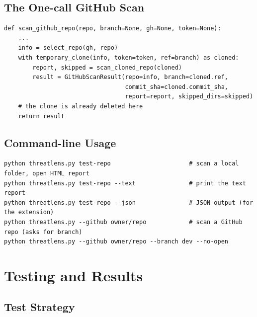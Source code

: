 \documentclass[12pt,a4paper]{article}
\newcommand{\code}[1]{\texttt{\detokenize{#1}}}
\begin{document}
\subsection{The One-call GitHub Scan}

\begin{lstlisting}[caption={Core of \code{scan_github_repo} (github\_integration/pipeline.py)},label={lst:pipeline}]
def scan_github_repo(repo, branch=None, gh=None, token=None):
    ...
    info = select_repo(gh, repo)
    with temporary_clone(info, token=token, ref=branch) as cloned:
        report, skipped = scan_cloned_repo(cloned)
        result = GitHubScanResult(repo=info, branch=cloned.ref,
                                  commit_sha=cloned.commit_sha,
                                  report=report, skipped_dirs=skipped)
    # the clone is already deleted here
    return result
\end{lstlisting}

\subsection{Command-line Usage}

\begin{lstlisting}[language={},caption={Main commands},label={lst:cli}]
python threatlens.py test-repo                      # scan a local folder, open HTML report
python threatlens.py test-repo --text               # print the text report
python threatlens.py test-repo --json               # JSON output (for the extension)
python threatlens.py --github owner/repo            # scan a GitHub repo (asks for branch)
python threatlens.py --github owner/repo --branch dev --no-open
\end{lstlisting}

\section{Testing and Results}

\subsection{Test Strategy}
\end{document}

